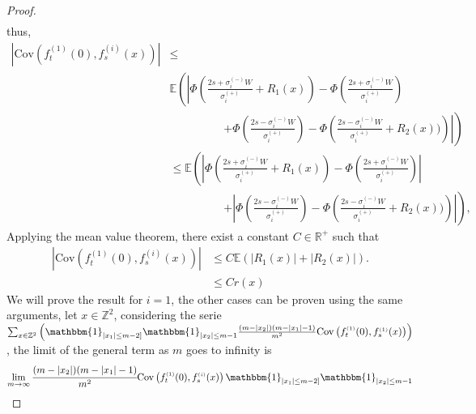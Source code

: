 \documentclass[12pt]{article}
\theoremstyle{Theorem}
\begin{document}
\begin{proof}
{\begin{align*}
\end{align*}
}
thus, 
{\small
\begin{align*}
 |\text{Cov}\left(f_{t}^{\scriptscriptstyle(1)}(0), f_{s}^{\scriptscriptstyle(i)}(x) \right)| & \leq \\
 &  \mathbb{E}\left(\left|\Phi\left(\frac{2s + \sigma^{\scriptscriptstyle (-)}_{i}W}{\sigma^{\scriptscriptstyle (+)}_{i}} + R_{1}(x) \right)  - \Phi\left(\frac{2s + \sigma^{\scriptscriptstyle (-)}_{i}W}{\sigma^{\scriptscriptstyle (+)}_{i}} \right) \right. \right. \\
 & \hspace{2cm} \left. \left.+ \Phi\left(\frac{2s - \sigma^{\scriptscriptstyle (-)}_{i}W}{\sigma^{\scriptscriptstyle (+)}_{i}} \right) - \Phi\left(\frac{2s -\sigma^{\scriptscriptstyle (-)}_{i}W }{\sigma^{\scriptscriptstyle (+)}_{i}} + R_{2}(x))\right)\right|\right) \\
 & \leq \mathbb{E}\left(\left|\Phi\left(\frac{2s + \sigma^{\scriptscriptstyle (-)}_{i}W}{\sigma^{\scriptscriptstyle (+)}_{i}} + R_{1}(x) \right)  - \Phi\left(\frac{2s + \sigma^{\scriptscriptstyle (-)}_{i}W}{\sigma^{\scriptscriptstyle (+)}_{i}} \right) \right| \right. \\
 & \hspace{2cm} \left. + \left| \Phi\left(\frac{2s - \sigma^{\scriptscriptstyle (-)}_{i}W}{\sigma^{\scriptscriptstyle (+)}_{i}} \right) - \Phi\left(\frac{2s -\sigma^{\scriptscriptstyle (-)}_{i}W }{\sigma^{\scriptscriptstyle (+)}_{i}} + R_{2}(x))\right)\right|\right),
 \end{align*}}
Applying the mean value theorem, there exist a constant $C \in \mathbb{R}^{+}$ such that 
\begin{align*}
 |\text{Cov}\left(f_{t}^{\scriptscriptstyle(1)}(0), f_{s}^{\scriptscriptstyle(i)}(x) \right)| & \leq C\mathbb{E}\left(|R_{1}(x)| + |R_{2}(x)|\right). \\
& \leq Cr(x)
\end{align*}
We will prove the result for $i =1$, the other cases can be proven using the same arguments, let $x \in \mathbb{Z}^{2}$, considering the serie $\sum_{x \in \mathbb{Z}^{2}}\left(\mathbbm{1}_{|x_{1}| \leq m-2]}\mathbbm{1}_{|x_{2}| \leq m-1} \frac{(m-|x_2|)(m-|x_1| -1)}{m^2} \text{Cov}\left(f_{t}^{\scriptscriptstyle(1)}(0), f_{s}^{\scriptscriptstyle(1)}(x) \right) \right)$,
the limit of the general term as $m$ goes to infinity is
\begin{align*}
\lim_{m \to \infty}\cfrac{(m-|x_2|)(m-|x_1| -1)}{m^2} \text{Cov}\left(f_{t}^{\scriptscriptstyle(1)}(0), f_{s}^{\scriptscriptstyle(i)}(x) \right)\mathbbm{1}_{|x_{1}| \leq m-2]}\mathbbm{1}_{|x_{2}| \leq m-1}  \\

\end{align*}
\end{proof}
\end{document}
